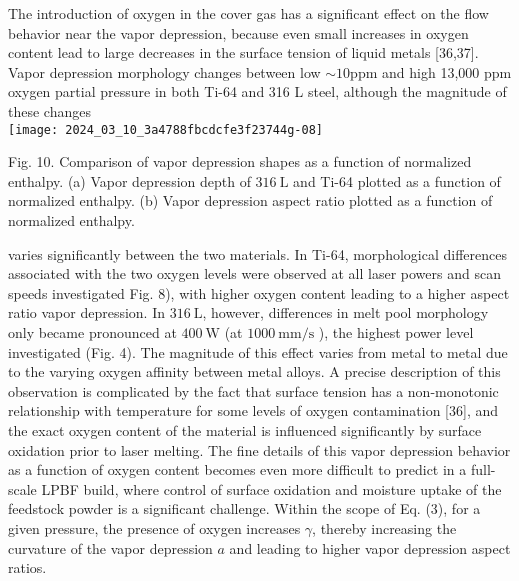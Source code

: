 \documentclass[10pt]{article}
\begin{document}
The introduction of oxygen in the cover gas has a significant effect on the flow behavior near the vapor depression, because even small increases in oxygen content lead to large decreases in the surface tension of liquid metals [36,37]. Vapor depression morphology changes between low $\sim 10 \mathrm{ppm}$ and high 13,000 ppm oxygen partial pressure in both Ti-64 and 316 L steel, although the magnitude of these changes\\
\texttt{[image: 2024\_03\_10\_3a4788fbcdcfe3f23744g-08]}

Fig. 10. Comparison of vapor depression shapes as a function of normalized enthalpy. (a) Vapor depression depth of $316 \mathrm{~L}$ and Ti-64 plotted as a function of normalized enthalpy. (b) Vapor depression aspect ratio plotted as a function of normalized enthalpy.

varies significantly between the two materials. In Ti-64, morphological differences associated with the two oxygen levels were observed at all laser powers and scan speeds investigated Fig. 8), with higher oxygen content leading to a higher aspect ratio vapor depression. In $316 \mathrm{~L}$, however, differences in melt pool morphology only became pronounced at $400 \mathrm{~W}$ (at $1000 \mathrm{~mm} / \mathrm{s}$ ), the highest power level investigated (Fig. 4). The magnitude of this effect varies from metal to metal due to the varying oxygen affinity between metal alloys. A precise description of this observation is complicated by the fact that surface tension has a non-monotonic relationship with temperature for some levels of oxygen contamination [36], and the exact oxygen content of the material is influenced significantly by surface oxidation prior to laser melting. The fine details of this vapor depression behavior as a function of oxygen content becomes even more difficult to predict in a full-scale LPBF build, where control of surface oxidation and moisture uptake of the feedstock powder is a significant challenge. Within the scope of Eq. (3), for a given pressure, the presence of oxygen increases $\gamma$, thereby increasing the curvature of the vapor depression $a$ and leading to higher vapor depression aspect ratios.
\end{document}
